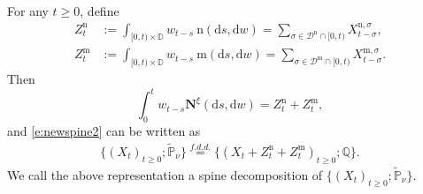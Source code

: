 \documentclass[12pt,a4paper]{amsart}
\numberwithin{equation}{section}
\theoremstyle{plain}
\theoremstyle{definition}
\theoremstyle{remark}
\begin{document}
\begin{comment}
\]
	is a Poisson random measure on $\mathbb R \times \mathbb D$ with intensity
\begin{align}
 \mathbf m({\mathrm d}s,{\mathrm d}w):= {\mathrm d}s \cdot \int_{(0,\infty)} y \mathbb P_{y\delta_{\xi_s}}(X\in {\mathrm d}w) \pi(\xi_s,{\mathrm d}y);
\end{align}
\item
	Given $\{(\xi_t)_{t\in\mathbb R}; \mathbb Q\}$, , the continuum immigration $(X^{\mathrm n,\sigma})_{\sigma \in \mathcal D^n}$ and the discrete immigration $(X^{\mathrm m,\sigma})_{\sigma\in \mathcal D^{\mathrm m}}$ are independent of each other.
\item
	$\{(X_t)_{t\geq 0}; \mathbb Q\}$ is a copy of the superprocess $\{(X_t)_{t\geq 0}; \mathbb P_\mu\}$, and is independent of the spine process $(\xi_t)_{t\in \mathbb R}$, the continuum immigration $(X^{\mathrm n, \sigma})_{\sigma \in \mathcal D^\mathrm n}$ and the discrete immigration $(X^{\mathrm m, \sigma})_{\sigma\in \mathcal D^{\mathrm m}}$.
\end{itemize}
\end{comment}


For any $t\geq 0$, define
\begin{align}
	Z^{\mathrm n}_t
&:= \int_{[0, t)\times \mathbb D} w_{t-s} ~\mathrm n ({\mathrm d}s,{\mathrm d}w)
	= \sum_{\sigma \in \mathcal D^\mathrm n \cap [0, t)} X^{\mathrm n,\sigma}_{t-\sigma},	
	\\ Z^{\mathrm m}_t
&:= \int_{[0, t)\times \mathbb D} w_{t-s} ~\mathrm m ({\mathrm d}s,{\mathrm d}w)
	= \sum_{\sigma \in \mathcal D^\mathrm m \cap [0, t)} X^{\mathrm m,\sigma}_{t-\sigma}.
  \end{align}
Then \begin{equation}\label{def-Zt}
\int^t_0w_{t-s}\mathbf N^\xi({\mathrm d}s, {\mathrm d}w)= Z^{\mathrm n}_{t} + Z^{\mathrm m}_{t},
\end{equation}
 and \eqref{e:newspine2} can be written as
\begin{align}\label{spine-decom2}
	\{(X_t)_{t\geq 0}; \widetilde{\mathbb P}_\nu\}
	\overset{f.d.d.}{=}
\{(X_t + Z^{\mathrm n}_{t} + Z^{\mathrm m}_{t} )_{t\geq 0}; \mathbb Q\}.
\end{align}
We call the above representation a spine decomposition of $\{(X_t)_{t\geq 0}; \widetilde{\mathbb P}_\nu\} $.
\end{document}
